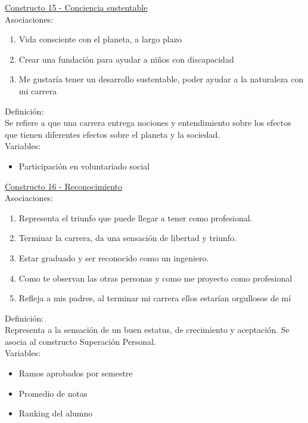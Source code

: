 \underline {Constructo 15 - Conciencia sustentable} \\
Asociaciones:
\begin{enumerate}
	\item Vida consciente con el planeta, a largo plazo
	\item Crear una fundación para ayudar a niños con discapacidad	
	\item Me gustaría tener un desarrollo sustentable, poder ayudar a la naturaleza con mi carrera
\end{enumerate}

Definición:\\

Se refiere a que una carrera entrega nociones y entendimiento sobre los efectos que tienen diferentes efectos sobre el planeta y la sociedad.\\  

Variables:\\
\begin{itemize}
	\item Participación en voluntariado social	
\end{itemize} 

\underline {Constructo 16 - Reconocimiento} \\
Asociaciones:
\begin{enumerate}
	\item Representa el triunfo que puede llegar a tener como profesional.
	\item Terminar la carrera, da una sensación de libertad y triunfo. 
	\item Estar graduado y ser reconocido como un ingeniero.
	\item Como te observan las otras personas y como me proyecto como profesional	
	\item Refleja a mis padres, al terminar mi carrera ellos estarían orgullosos de mí
\end{enumerate}

Definición:\\

Representa a la sensación de un buen estatus, de crecimiento y aceptación. Se asocia al constructo Superación Personal.\\

Variables:\\
\begin{itemize}
	\item Ramos aprobados por semestre
	\item Promedio de notas
	\item Ranking del alumno	
\end{itemize} 

